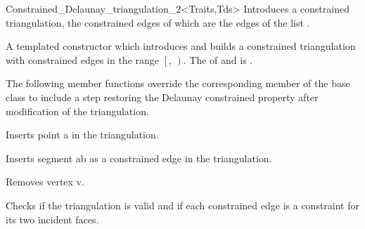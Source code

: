 \begin{ccClassTemplate}{Constrained_Delaunay_triangulation_2<Traits,Tds>}
{Introduces a constrained triangulation, the constrained edges of which
are the edges of the list .}


{A templated constructor which introduces and builds
 a constrained triangulation with constrained edges in the range 
$\left[\right.$, $\left.\right)$.
\ccPrecond The  of  and 
 is .}






The following member functions override the corresponding
member of the base class to include a step restoring
 the Delaunay constrained
property after modification of the triangulation.

{ Inserts point a in the triangulation. }

{ Inserts segment ab as a constrained edge in the triangulation. }




{ Removes vertex v. }



{ Checks if the triangulation is valid and if each constrained edge is
a constraint for its two incident faces.}

\end{ccClassTemplate}

